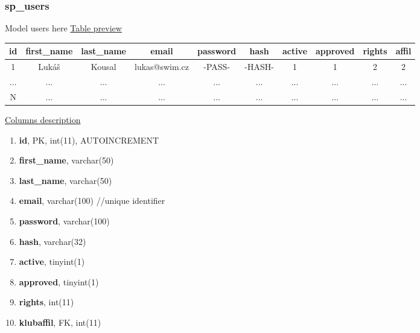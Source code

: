 \subsubsection*{sp\_users}
Model users here
\newline
\underline{Table preview}
\begin{center}
  \begin{tabular}{||c c c c c c c c c c||} 
  \hline
  id & first\_name & last\_name & email & password & hash & active & approved & rights & affil \\ [0.5ex] 
  \hline\hline
  1 & Lukáš & Kousal & lukas@swim.cz & -PASS- & -HASH- & 1 & 1 & 2 & 2 \\ 
  \hline
  ... & ... & ... & ... & ... & ... & ... & ... & ... & ... \\
  \hline
  N & ... & ... & ... & ... & ... & ... & ... & ... & ... \\ [1ex] 
  \hline
 \end{tabular}
 \end{center}
 \underline{Columns description}
 \begin{enumerate}
   \setlength\itemsep{0em}
   \item \textbf{id}, PK, int(11), AUTOINCREMENT
   \item \textbf{first\_name}, varchar(50)
   \item \textbf{last\_name}, varchar(50)
   \item \textbf{email}, varchar(100) //unique identifier
   \item \textbf{password}, varchar(100)
   \item \textbf{hash}, varchar(32)
   \item \textbf{active}, tinyint(1)
   \item \textbf{approved}, tinyint(1)
   \item \textbf{rights}, int(11)
   \item \textbf{klubaffil}, FK, int(11)
\end{enumerate}

